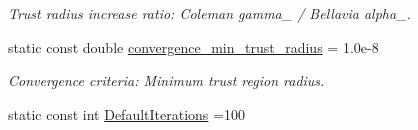 \begin{DoxyCompactItemize}
\begin{DoxyCompactList}\small\item\em Trust radius increase ratio\+: Coleman gamma\+\_ / Bellavia alpha\+\_. \end{DoxyCompactList}\item 
static const double \hyperlink{classmappel_1_1estimator_1_1TrustRegionMaximizer_add5c14c259ffcdd9040832a9a51a136c}{convergence\+\_\+min\+\_\+trust\+\_\+radius} = 1.\+0e-\/8
\begin{DoxyCompactList}\small\item\em Convergence criteria\+: Minimum trust region radius. \end{DoxyCompactList}\item 
static const int \hyperlink{classmappel_1_1estimator_1_1IterativeMaximizer_ab66c01c2eee630f3fca119f3fe09a19a}{Default\+Iterations} =100
\end{DoxyCompactItemize}
